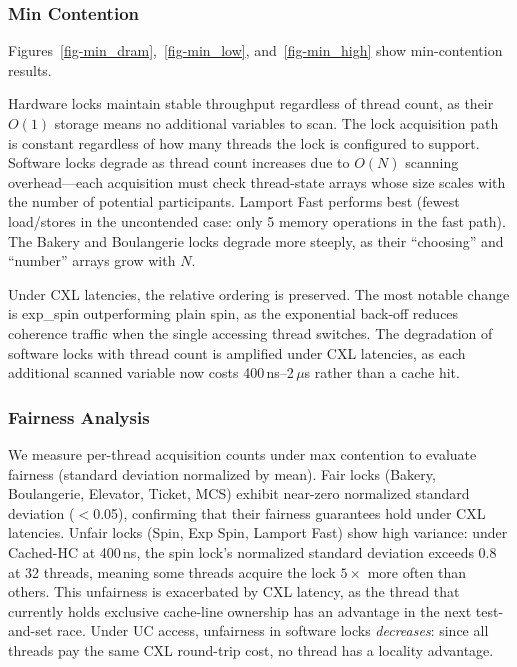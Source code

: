\subsubsection{Min Contention}

Figures~\ref{fig-min_dram},~\ref{fig-min_low}, and~\ref{fig-min_high} show min-contention results.

Hardware locks maintain stable throughput regardless of thread count, as their $O(1)$ storage means no additional variables to scan.
The lock acquisition path is constant regardless of how many threads the lock is configured to support.
Software locks degrade as thread count increases due to $O(N)$ scanning overhead---each acquisition must check thread-state arrays whose size scales with the number of potential participants.
Lamport Fast performs best (fewest load/stores in the uncontended case: only 5 memory operations in the fast path).
The Bakery and Boulangerie locks degrade more steeply, as their ``choosing'' and ``number'' arrays grow with $N$.

Under CXL latencies, the relative ordering is preserved.
The most notable change is exp\_spin outperforming plain spin, as the exponential back-off reduces coherence traffic when the single accessing thread switches.
The degradation of software locks with thread count is amplified under CXL latencies, as each additional scanned variable now costs 400\,ns--2\,$\mu$s rather than a cache hit.

\subsubsection{Fairness Analysis}

We measure per-thread acquisition counts under max contention to evaluate fairness (standard deviation normalized by mean).
Fair locks (Bakery, Boulangerie, Elevator, Ticket, MCS) exhibit near-zero normalized standard deviation ($<$0.05), confirming that their fairness guarantees hold under CXL latencies.
Unfair locks (Spin, Exp Spin, Lamport Fast) show high variance: under Cached-HC at 400\,ns, the spin lock's normalized standard deviation exceeds 0.8 at 32 threads, meaning some threads acquire the lock $5\times$ more often than others.
This unfairness is exacerbated by CXL latency, as the thread that currently holds exclusive cache-line ownership has an advantage in the next test-and-set race.
Under UC access, unfairness in software locks \emph{decreases}: since all threads pay the same CXL round-trip cost, no thread has a locality advantage.

